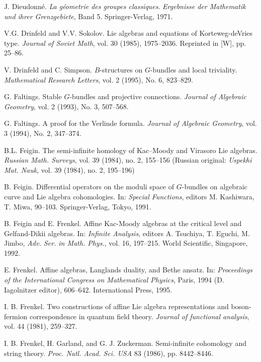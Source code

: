 \begin{description}[leftmargin=3.2em,itemsep=2pt]
\item[{[D71]}] J. Dieudonné. \emph{La géometrie des groupes classiques}. \emph{Ergebnisse der Mathematik und ihrer Grenzgebiete}, Band 5. Springer-Verlag, 1971.
\item[{[DS85]}] V.G. Drinfeld and V.V. Sokolov. Lie algebras and equations of Korteweg-deVries type. \emph{Journal of Soviet Math}, vol. 30 (1985), 1975--2036. Reprinted in [W], pp. 25--86.
\item[{[DSim]}] V. Drinfeld and C. Simpson. $B$-structures on $G$-bundles and local triviality. \emph{Mathematical Research Letters}, vol. 2 (1995), No. 6, 823--829.
\item[{[Fal93]}] G. Faltings. Stable $G$-bundles and projective connections. \emph{Journal of Algebraic Geometry}, vol. 2 (1993), No. 3, 507--568.
\item[{[Fal94]}] G. Faltings. A proof for the Verlinde formula. \emph{Journal of Algebraic Geometry}, vol. 3 (1994), No. 2, 347--374.
\item[{[F84]}] B.L. Feigin. The semi-infinite homology of Kac--Moody and Virasoro Lie algebras. \emph{Russian Math. Surveys}, vol. 39 (1984), no. 2, 155--156 (Russian original: \emph{Uspekhi Mat. Nauk}, vol. 39 (1984), no. 2, 195--196)
\item[{[F91]}] B. Feigin. Differential operators on the moduli space of $G$-bundles on algebraic curve and Lie algebra cohomologies. In: \emph{Special Functions}, editors M. Kashiwara, T. Miwa, 90--103. Springer-Verlag, Tokyo, 1991.
\item[{[FF92]}] B. Feigin and E. Frenkel. Affine Kac-Moody algebras at the critical level and Gelfand-Dikii algebras. In: \emph{Infinite Analysis}, editors A. Tsuchiya, T. Eguchi, M. Jimbo, \emph{Adv. Ser. in Math. Phys.}, vol. 16, 197--215. World Scientific, Singapore, 1992.
\item[{[Fr]}] E. Frenkel. Affine algebras, Langlands duality, and Bethe ansatz. In: \emph{Proceedings of the International Congress on Mathematical Physics}, Paris, 1994 (D. Iagolnitzer editor), 606--642. International Press, 1995.
\item[{[Fr81]}] I. B. Frenkel. Two constructions of affine Lie algebra representations and boson-fermion correspondence in quantum field theory. \emph{Journal of functional analysis}, vol. 44 (1981), 259--327.
\item[{[FGZ86]}] I. B. Frenkel, H. Garland, and G. J. Zuckerman. Semi-infinite cohomology and string theory. \emph{Proc. Natl. Acad. Sci. USA} 83 (1986), pp. 8442--8446.

\end{description}
